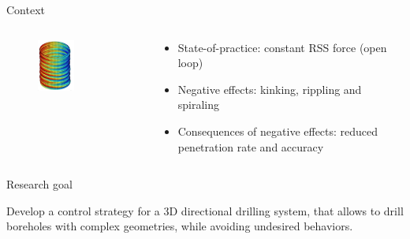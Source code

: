 \documentclass[10pt]{beamer}
\begin{document}
\begin{frame}{Context}
		\begin{columns}[T]	\begin{column}{0.5\textwidth}\setlength{\leftmargini}{0pt}
				\vspace{1cm}
				\begin{figure}[ht]\centering
					\includegraphics[width=0.5\textwidth]{images/Spiraling.png}
				\end{figure}
			\centering	[Sugiura 2009]
			\end{column}
			\begin{column}{0.6\textwidth}\setlength{\leftmargini}{0pt}
				\begin{itemize}
					\setlength\itemsep{3em}
					\item State-of-practice: constant RSS force (open loop)
					\item Negative effects: kinking, rippling and spiraling
					\item Consequences of negative effects: reduced penetration rate and accuracy
				\end{itemize}			
			\end{column}
		\end{columns}
\end{frame}

\begin{frame}{Research goal}
	\begin{block}{}\Large Develop a control strategy for a 3D directional drilling system, that allows to drill boreholes with complex geometries, while avoiding undesired behaviors.
	\end{block}
\end{frame}
\end{document}
